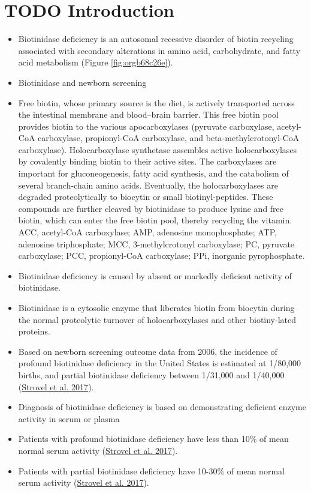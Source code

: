 \documentclass[review]{elsarticle}
\begin{document}
\section*{{\bfseries\sffamily TODO} Introduction}
\label{sec:org41a3eca}
\begin{itemize}
\item Biotinidase deficiency is an autosomal recessive disorder of biotin
recycling associated with secondary alterations in amino acid,
carbohydrate, and fatty acid metabolism (Figure \ref{fig:orgb68c26e}).

\item Biotinidase and newborn screening
\item Free biotin, whose primary source is the diet, is
actively transported across the intestinal membrane and blood–brain
barrier. This free biotin pool provides biotin to the various
apocarboxylases (pyruvate carboxylase, acetyl-CoA carboxylase,
propionyl-CoA carboxylase, and beta-methylcrotonyl-CoA
carboxylase). Holocarboxylase synthetase assembles active
holocarboxylases by covalently binding biotin to their active
sites. The carboxylases are important for gluconeogenesis, fatty
acid synthesis, and the catabolism of several branch-chain amino
acids. Eventually, the holocarboxylases are degraded proteolytically
to biocytin or small biotinyl-peptides. These compounds are further
cleaved by biotinidase to produce lysine and free biotin, which can
enter the free biotin pool, thereby recycling the vitamin. ACC,
acetyl-CoA carboxylase; AMP, adenosine monophosphate; ATP, adenosine
triphosphate; MCC, 3-methylcrotonyl carboxylase; PC, pyruvate
carboxylase; PCC, propionyl-CoA carboxylase; PPi, inorganic
pyrophosphate.
\item Biotinidase deficiency is caused by absent or markedly deficient
activity of biotinidase.

\item Biotinidase is a cytosolic enzyme that liberates biotin from
biocytin during the normal proteolytic turnover of holocarboxylases
and other biotiny-lated proteins.

\item Based on newborn screening outcome data from 2006, the incidence of
profound biotinidase deficiency in the United States is estimated at
1/80,000 births, and partial biotinidase deficiency between 1/31,000
and 1/40,000 (\hyperlink{citeproc_bib_item_4}{Strovel et al. 2017}).

\item Diagnosis of biotinidase deficiency is based on demonstrating
deficient enzyme activity in serum or plasma

\item Patients with profound biotinidase deficiency have less than 10\% of
mean normal serum activity (\hyperlink{citeproc_bib_item_4}{Strovel et al. 2017}).

\item Patients with partial biotinidase deficiency have 10-30\% of mean
normal serum activity (\hyperlink{citeproc_bib_item_4}{Strovel et al. 2017}).
\end{itemize}
\end{document}
